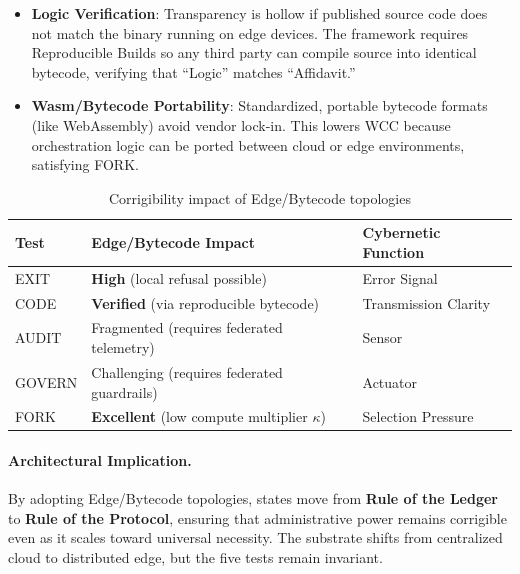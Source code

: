 \documentclass[11pt,a4paper]{article}
\theoremstyle{definition}
\begin{document}
\begin{itemize}[noitemsep]
    \item \textbf{Logic Verification}: Transparency is hollow if published source code does not match the binary running on edge devices. The framework requires Reproducible Builds so any third party can compile source into identical bytecode, verifying that ``Logic'' matches ``Affidavit.''

    \item \textbf{Wasm/Bytecode Portability}: Standardized, portable bytecode formats (like WebAssembly) avoid vendor lock-in. This lowers WCC because orchestration logic can be ported between cloud or edge environments, satisfying FORK.
\end{itemize}

\begin{table}[htbp]
\centering
\caption{Corrigibility impact of Edge/Bytecode topologies}
\label{tab:edge-bytecode}
\small
\begin{tabular}{@{}lll@{}}
\toprule
\textbf{Test} & \textbf{Edge/Bytecode Impact} & \textbf{Cybernetic Function} \\
\midrule
EXIT & \textbf{High} (local refusal possible) & Error Signal \\
CODE & \textbf{Verified} (via reproducible bytecode) & Transmission Clarity \\
AUDIT & Fragmented (requires federated telemetry) & Sensor \\
GOVERN & Challenging (requires federated guardrails) & Actuator \\
FORK & \textbf{Excellent} (low compute multiplier $\kappa$) & Selection Pressure \\
\bottomrule
\end{tabular}
\end{table}

\paragraph{Architectural Implication.} By adopting Edge/Bytecode topologies, states move from \textbf{Rule of the Ledger} to \textbf{Rule of the Protocol}, ensuring that administrative power remains corrigible even as it scales toward universal necessity. The substrate shifts from centralized cloud to distributed edge, but the five tests remain invariant.

\end{document}
